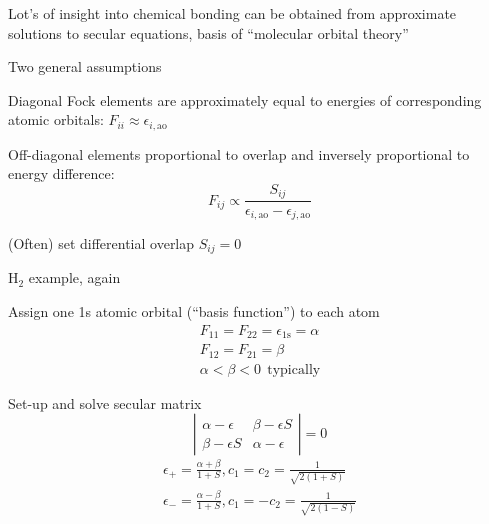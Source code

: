\message{ !name(Outline.tex)}\documentclass[11pt]{article}
\begin{document}
\begin{outline}
\begin{outline}
\begin{outline}
   \item Lot's of insight into chemical bonding can be obtained from
     approximate solutions to secular equations, basis of ``molecular orbital theory''
   \item Two general assumptions
     \begin{outline}
     \item Diagonal Fock elements are approximately equal to energies of
       corresponding atomic orbitals: $F_{ii} \approx \epsilon_{i,\mathrm{ao}}$
     \item Off-diagonal elements proportional to overlap and inversely
       proportional to energy difference:
       \begin{displaymath}
         F_{ij} \propto \frac{S_{ij}}{\epsilon_{i,\mathrm{ao}}-\epsilon_{j,\mathrm{ao}}}
       \end{displaymath}
     \item (Often) set differential overlap $S_{ij}=0$
     \end{outline}
   \end{outline}
 \item H$_2$ example, again
   \begin{outline}
   \item Assign one 1s atomic orbital (``basis function'') to each atom
     \begin{eqnarray*}
       F_{11}=F_{22}=\epsilon_{1\mathrm{s}}=\alpha \\
       F_{12}=F_{21}=\beta \\
       \alpha < \beta < 0\ \ \mathrm{typically}
     \end{eqnarray*}
   \item Set-up and solve secular matrix
     \begin{displaymath}
      \left | \begin{array}{cc}
          \alpha-\epsilon & \beta-\epsilon S \\
          \beta - \epsilon S & \alpha-\epsilon
          \end{array} \right | = 0
     \end{displaymath}
     \begin{eqnarray*}
       \epsilon_+=\frac{\alpha+\beta}{1+S}, c_1=c_2=\frac{1}{\sqrt{2(1+S)}} \\
       \epsilon_-=\frac{\alpha-\beta}{1+S}, c_1=-c_2=\frac{1}{\sqrt{2(1-S)}} \\
     \end{eqnarray*}
     \begin{center}

\end{center}
\end{outline}
\end{outline}
\end{outline}
\end{document}
